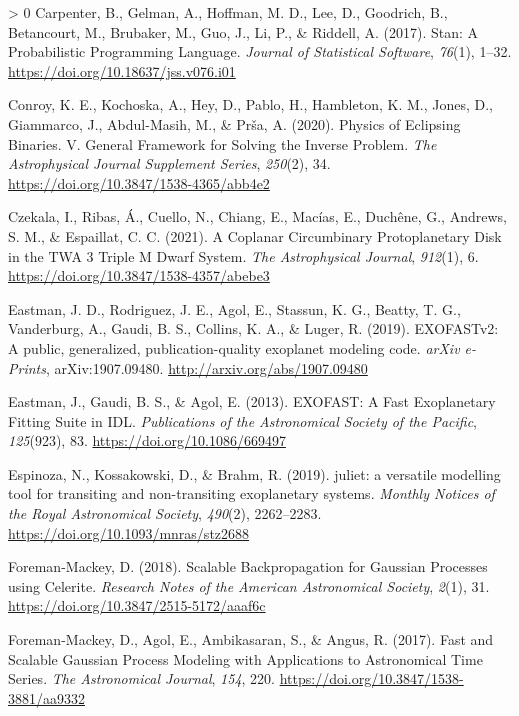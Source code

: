 \documentclass[10pt,a4paper,onecolumn]{article}
\newlength{\cslhangindent}
\newenvironment{CSLReferences}[3] %
 {%
  \setlength{\parindent}{0pt}
  \ifodd #1 \everypar{\setlength{\hangindent}{\cslhangindent}}\ignorespaces\fi
  \ifnum #2 > 0
  \setlength{\parskip}{#2\baselineskip}
  \fi
 }%
 {}
\begin{document}
\begin{CSLReferences}{1}{0}
\leavevmode\hypertarget{ref-carpenter17}{}%
Carpenter, B., Gelman, A., Hoffman, M. D., Lee, D., Goodrich, B.,
Betancourt, M., Brubaker, M., Guo, J., Li, P., \& Riddell, A. (2017).
{Stan: A Probabilistic Programming Language}. \emph{Journal of
Statistical Software}, \emph{76}(1), 1--32.
\url{https://doi.org/10.18637/jss.v076.i01}

\leavevmode\hypertarget{ref-conroy20}{}%
Conroy, K. E., Kochoska, A., Hey, D., Pablo, H., Hambleton, K. M.,
Jones, D., Giammarco, J., Abdul-Masih, M., \& Prša, A. (2020). {Physics
of Eclipsing Binaries. V. General Framework for Solving the Inverse
Problem}. \emph{The Astrophysical Journal Supplement Series},
\emph{250}(2), 34. \url{https://doi.org/10.3847/1538-4365/abb4e2}

\leavevmode\hypertarget{ref-czekala21}{}%
Czekala, I., Ribas, Á., Cuello, N., Chiang, E., Macías, E., Duchêne, G.,
Andrews, S. M., \& Espaillat, C. C. (2021). {A Coplanar Circumbinary
Protoplanetary Disk in the TWA 3 Triple M Dwarf System}. \emph{The
Astrophysical Journal}, \emph{912}(1), 6.
\url{https://doi.org/10.3847/1538-4357/abebe3}

\leavevmode\hypertarget{ref-eastman19}{}%
Eastman, J. D., Rodriguez, J. E., Agol, E., Stassun, K. G., Beatty, T.
G., Vanderburg, A., Gaudi, B. S., Collins, K. A., \& Luger, R. (2019).
{EXOFASTv2: A public, generalized, publication-quality exoplanet
modeling code}. \emph{arXiv e-Prints}, arXiv:1907.09480.
\url{http://arxiv.org/abs/1907.09480}

\leavevmode\hypertarget{ref-eastman13}{}%
Eastman, J., Gaudi, B. S., \& Agol, E. (2013). {EXOFAST: A Fast
Exoplanetary Fitting Suite in IDL}. \emph{Publications of the
Astronomical Society of the Pacific}, \emph{125}(923), 83.
\url{https://doi.org/10.1086/669497}

\leavevmode\hypertarget{ref-espinoza19}{}%
Espinoza, N., Kossakowski, D., \& Brahm, R. (2019). {juliet: a versatile
modelling tool for transiting and non-transiting exoplanetary systems}.
\emph{Monthly Notices of the Royal Astronomical Society}, \emph{490}(2),
2262--2283. \url{https://doi.org/10.1093/mnras/stz2688}

\leavevmode\hypertarget{ref-foremanmackey18}{}%
Foreman-Mackey, D. (2018). {Scalable Backpropagation for Gaussian
Processes using Celerite}. \emph{Research Notes of the American
Astronomical Society}, \emph{2}(1), 31.
\url{https://doi.org/10.3847/2515-5172/aaaf6c}

\leavevmode\hypertarget{ref-foremanmackey17}{}%
Foreman-Mackey, D., Agol, E., Ambikasaran, S., \& Angus, R. (2017).
{Fast and Scalable Gaussian Process Modeling with Applications to
Astronomical Time Series}. \emph{The Astronomical Journal}, \emph{154},
220. \url{https://doi.org/10.3847/1538-3881/aa9332}


\end{CSLReferences}
\end{document}
